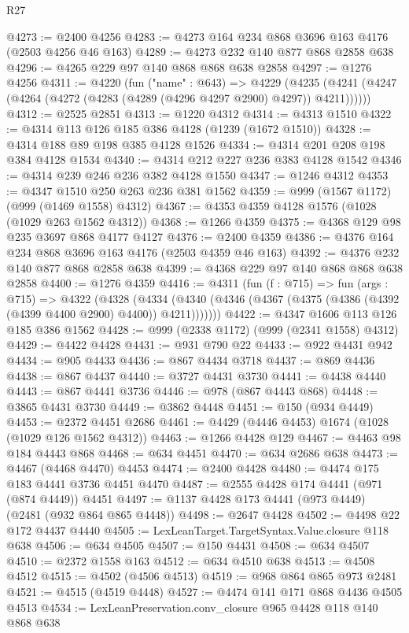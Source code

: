 \begin{lexlean}{R27}
\begin{coremodule}
@4273 := @2400 @4256
@4283 := @4273 @164 @234 @868 @3696 @163 @4176 (@2503 @4256 @46 @163)
@4289 := @4273 @232 @140 @877 @868 @2858 @638
@4296 := @4265 @229 @97 @140 @868 @868 @638 @2858
@4297 := @1276 @4256
@4311 := @4220
    (fun ("name" : @643) =>
    @4229 (@4235 (@4241 (@4247 (@4264 (@4272 (@4283 (@4289 (@4296 @4297 @2900) @4297)) @4211))))))
@4312 := @2525 @2851
@4313 := @1220 @4312
@4314 := @4313 @1510
@4322 := @4314 @113 @126 @185 @386 @4128 (@1239 (@1672 @1510))
@4328 := @4314 @188 @89 @198 @385 @4128 @1526
@4334 := @4314 @201 @208 @198 @384 @4128 @1534
@4340 := @4314 @212 @227 @236 @383 @4128 @1542
@4346 := @4314 @239 @246 @236 @382 @4128 @1550
@4347 := @1246 @4312
@4353 := @4347 @1510 @250 @263 @236 @381 @1562
@4359 := @999 (@1567 @1172) (@999 (@1469 @1558) @4312)
@4367 := @4353 @4359 @4128 @1576 (@1028 (@1029 @263 @1562 @4312))
@4368 := @1266 @4359
@4375 := @4368 @129 @98 @235 @3697 @868 @4177 @4127
@4376 := @2400 @4359
@4386 := @4376 @164 @234 @868 @3696 @163 @4176 (@2503 @4359 @46 @163)
@4392 := @4376 @232 @140 @877 @868 @2858 @638
@4399 := @4368 @229 @97 @140 @868 @868 @638 @2858
@4400 := @1276 @4359
@4416 := @4311
    (fun (f : @715) =>
    fun (args : @715) =>
    @4322
      (@4328
        (@4334 (@4340 (@4346 (@4367 (@4375 (@4386 (@4392 (@4399 @4400 @2900) @4400)) @4211)))))))
@4422 := @4347 @1606 @113 @126 @185 @386 @1562
@4428 := @999 (@2338 @1172) (@999 (@2341 @1558) @4312)
@4429 := @4422 @4428
@4431 := @931 @790 @22
@4433 := @922 @4431 @942
@4434 := @905 @4433
@4436 := @867 @4434 @3718
@4437 := @869 @4436
@4438 := @867 @4437
@4440 := @3727 @4431 @3730
@4441 := @4438 @4440
@4443 := @867 @4441 @3736
@4446 := @978 (@867 @4443 @868)
@4448 := @3865 @4431 @3730
@4449 := @3862 @4448
@4451 := @150 (@934 @4449)
@4453 := @2372 @4451 @2686
@4461 := @4429 (@4446 @4453) @1674 (@1028 (@1029 @126 @1562 @4312))
@4463 := @1266 @4428 @129
@4467 := @4463 @98 @184 @4443 @868
@4468 := @634 @4451
@4470 := @634 @2686 @638
@4473 := @4467 (@4468 @4470) @4453
@4474 := @2400 @4428
@4480 := @4474 @175 @183 @4441 @3736 @4451 @4470
@4487 := @2555 @4428 @174 @4441 (@971 (@874 @4449)) @4451
@4497 := @1137 @4428 @173 @4441 (@973 @4449) (@2481 (@932 @864 @865 @4448))
@4498 := @2647 @4428
@4502 := @4498 @22 @172 @4437 @4440
@4505 := LexLeanTarget.TargetSyntax.Value.closure @118 @638
@4506 := @634 @4505
@4507 := @150 @4431
@4508 := @634 @4507
@4510 := @2372 @1558 @163
@4512 := @634 @4510 @638
@4513 := @4508 @4512
@4515 := @4502 (@4506 @4513)
@4519 := @968 @864 @865 @973 @2481
@4521 := @4515 (@4519 @4448)
@4527 := @4474 @141 @171 @868 @4436 @4505 @4513
@4534 := LexLeanPreservation.conv_closure @965 @4428 @118 @140 @868 @638

\end{coremodule}
\end{lexlean}
